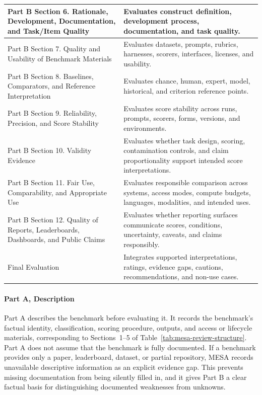\documentclass[conference]{IEEEtran}
\begin{document}
\begin{table}[t]
\begin{tabularx}{\textwidth}{@{}>{\raggedright\arraybackslash}p{}>{\raggedright\arraybackslash}X@{}}
    Part B Section 6. Rationale, Development, Documentation, and Task/Item Quality & Evaluates construct definition, development process, documentation, and task quality. \\ \hline
    Part B Section 7. Quality and Usability of Benchmark Materials & Evaluates datasets, prompts, rubrics, harnesses, scorers, interfaces, licenses, and usability. \\ \hline
    Part B Section 8. Baselines, Comparators, and Reference Interpretation & Evaluates chance, human, expert, model, historical, and criterion reference points. \\ \hline
    Part B Section 9. Reliability, Precision, and Score Stability & Evaluates score stability across runs, prompts, scorers, forms, versions, and environments. \\ \hline
    Part B Section 10. Validity Evidence & Evaluates whether task design, scoring, contamination controls, and claim proportionality support intended score interpretations. \\ \hline
    Part B Section 11. Fair Use, Comparability, and Appropriate Use & Evaluates responsible comparison across systems, access modes, compute budgets, languages, modalities, and intended uses. \\ \hline
    Part B Section 12. Quality of Reports, Leaderboards, Dashboards, and Public Claims & Evaluates whether reporting surfaces communicate scores, conditions, uncertainty, caveats, and claims responsibly. \\ \hline
    Final Evaluation & Integrates supported interpretations, ratings, evidence gaps, cautions, recommendations, and non-use cases. \\
    \bottomrule
    \end{tabularx}
    \end{table}
    
    \paragraph{Part A, Description}
    Part A describes the benchmark before evaluating it. It records the benchmark's factual identity, classification, scoring procedure, outputs, and access or lifecycle materials, corresponding to Sections~1--5 of Table~\ref{tab:mesa-review-structure}. Part A does not assume that the benchmark is fully documented. If a benchmark provides only a paper, leaderboard, dataset, or partial repository, MESA records unavailable descriptive information as an explicit evidence gap. This prevents missing documentation from being silently filled in, and it gives Part B a clear factual basis for distinguishing documented weaknesses from unknowns.
    
\end{document}
